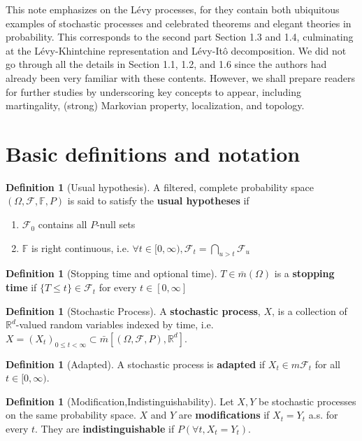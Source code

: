 \documentclass[openany,oneside]{book}
\theoremstyle{definition}
\newtheorem{defn}[thm]{Definition}
\theoremstyle{remark}
\newcommand{\R}{{\mathbb R}}%
\begin{document}
This note emphasizes on the L\'evy processes, for they contain both ubiquitous examples of stochastic processes and celebrated theorems and elegant theories in probability. This corresponds to the second part Section 1.3 and 1.4, culminating at the L\'evy-Khintchine representation and L\'evy-It\^o decomposition.  We did not go through all the details in Section 1.1, 1.2, and 1.6 since the authors had already been very familiar with these contents. However, we shall prepare readers for further studies by underscoring key concepts to appear, including martingality, (strong) Markovian property, localization, and topology.


\section{Basic definitions and notation}

\begin{defn}[Usual hypothesis]
A filtered, complete probability space $(\Omega,\mathcal{F},\mathbb{F},P)$ is said to satisfy the \textbf{usual hypotheses} if
\begin{enumerate}
	\item $\mathcal{F}_0$ contains all $P$-null sets
    \item $\mathbb{F}$ is right continuous, i.e. $\forall t\in[0,\infty),\mathcal{F}_t=\bigcap_{u>t}\mathcal{F}_u$
\end{enumerate}
\end{defn}

\begin{defn}[Stopping time and optional time]
$T\in \bar{m}(\Omega)$ is a \textbf{stopping time} if $\{T\leq t\}\in\mathcal{F}_t$ for every $t\in[0,\infty]$
\end{defn}

\begin{defn}[Stochastic Process]
A \textbf{stochastic process}, $X$, is a collection of $\R^d$-valued random variables indexed by time, i.e. $X=(X_t)_{0\leq t<\infty}\subset \bar{m}[(\Omega,\mathcal{F},P),\R^d]$. 
\end{defn}

\begin{defn}[Adapted]
A stochastic process is \textbf{adapted} if $X_t\in m\mathcal{F}_t$ for all $t\in[0,\infty)$.
\end{defn}

\begin{defn}[Modification,Indistinguishability]
Let $X,Y$ be stochastic processes on the same probability space. $X$ and $Y$ are \textbf{modifications} if $X_t=Y_t$ a.s. for every $t$. They are \textbf{indistinguishable} if $P(\forall t, X_t=Y_t)$.
\end{defn}
\end{document}
